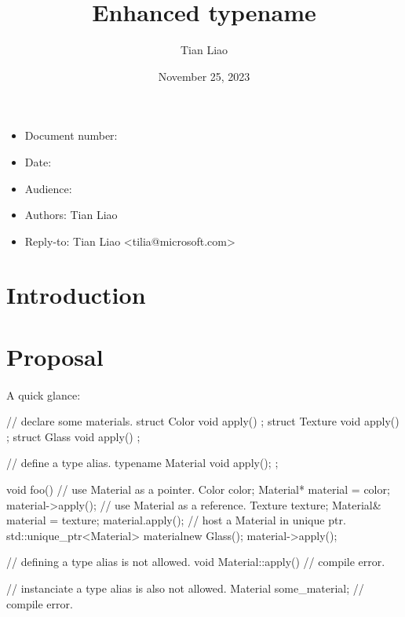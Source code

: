 \documentclass{article}
\title{Enhanced typename}
\author{Tian Liao}
\date{November 25, 2023}
\begin{document}
\maketitle
\vfill
\begin{itemize}[noitemsep]
  \item[] Document number:
  \item[] Date:
  \item[] Audience:
  \item[] Authors: Tian Liao
  \item[] Reply-to: Tian Liao \textless tilia@microsoft.com\textgreater
\end{itemize}

\newpage
{}

\section{Introduction}

\section{Proposal}

\paragraph{}
A quick glance:
\begin{codeblock}
// declare some materials.
struct Color { void apply() {} };
struct Texture { void apply() {} };
struct Glass { void apply() {} };

// define a type alias.
typename Material { void apply(); };

void foo() {
  {
    // use Material as a pointer.
    Color color;
    Material* material = color;
    material->apply();
  }
  {
    // use Material as a reference.
    Texture texture;
    Material& material = texture;
    material.apply();
  }
  {
    // host a Material in unique ptr.
    std::unique_ptr<Material> material{new Glass()};
    material->apply();
  }
}

// defining a type alias is not allowed.
void Material::apply() {} // compile error.

// instanciate a type alias is also not allowed.
Material some_material; // compile error.

\end{codeblock}
\end{document}
